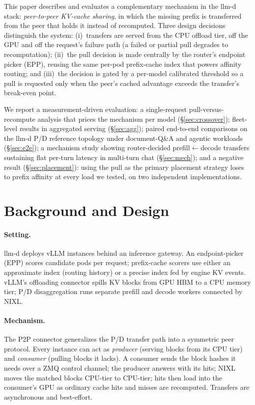 \documentclass[twocolumn,10pt]{article}
\newcommand{\llmd}{llm-d}
\begin{document}
This paper describes and evaluates a complementary mechanism in the
\llmd{} stack: \emph{peer-to-peer KV-cache sharing}, in which the
missing prefix is transferred from the peer that holds it instead of
recomputed. Three design decisions distinguish the system:
(i)~transfers are served from the CPU offload tier, off the GPU and off
the request's failure path (a failed or partial pull degrades to
recomputation); (ii)~the pull decision is made centrally by the
router's endpoint picker (EPP), reusing the same per-pod prefix-cache
index that powers affinity routing; and (iii)~the decision is gated by
a per-model calibrated threshold so a pull is requested only when the
peer's cached advantage exceeds the transfer's break-even point.

We report a measurement-driven evaluation: a single-request
pull-versus-recompute analysis that prices the mechanism per model
(\S\ref{sec:crossover}); fleet-level results in aggregated serving
(\S\ref{sec:agg}); paired end-to-end comparisons on the \llmd{}
P/D reference topology under document-Q\&A and agentic workloads
(\S\ref{sec:e2e}); a mechanism study showing router-decided
prefill$\leftarrow$decode transfers sustaining flat per-turn latency in
multi-turn chat (\S\ref{sec:mech}); and a negative result
(\S\ref{sec:placement}): using the pull as the primary placement
strategy loses to prefix affinity at every load we tested, on two
independent implementations.

\section{Background and Design}
\label{sec:design}
\paragraph{Setting.} \llmd{} deploys vLLM instances behind an inference
gateway. An endpoint-picker (EPP) scores candidate pods per request;
prefix-cache scorers use either an approximate index (routing history)
or a precise index fed by engine KV events. vLLM's offloading connector
spills KV blocks from GPU HBM to a CPU memory tier; P/D disaggregation
runs separate prefill and decode workers connected by NIXL.

\paragraph{Mechanism.} The P2P connector generalizes the P/D transfer
path into a symmetric peer protocol. Every instance can act as
\emph{producer} (serving blocks from its CPU tier) and \emph{consumer}
(pulling blocks it lacks). A consumer sends the block hashes it needs
over a ZMQ control channel; the producer answers with its hits; NIXL
moves the matched blocks CPU-tier to CPU-tier; hits then load into the
consumer's GPU as ordinary cache hits and misses are recomputed.
Transfers are asynchronous and best-effort.
\end{document}
